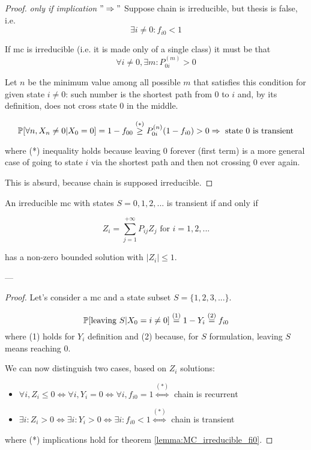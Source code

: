 	\begin{proof} \emph{only if implication} $"\Rightarrow"$
		Suppose chain is irreducible, but thesis is false, i.e.
		$$ \exists i \neq 0 : f_{i0} < 1 $$

		If \gls{mc} is irreducible (i.e. it is made only of a single class) it must be that
		$$ \forall i \neq 0, \exists m : P_{0i}^{(m)} > 0 $$

		Let $n$ be the minimum value among all possible $m$  that satisfies this condition for given state $i \neq 0$: such number is the shortest path from 0 to $i$ and, by its definition, does not cross state 0 in the middle.

		$$ \mathbb{P}[\forall n, X_n \neq 0 | X_0 = 0] = 1 - f_{00} \stackrel{(*)}{\ge} P_{0i}^{(n)} (1 - f_{i0}) > 0 \Rightarrow \text{ state 0 is transient} $$

		where (*) inequality holds because leaving 0 forever (first term) is a more general case of going to state $i$ via the shortest path and then not crossing 0 ever again.

		This is absurd, because chain is supposed irreducible.
	\end{proof}

	\begin{theorem}
		An irreducible \gls{mc} with states $S = 0, 1, 2, ...$ is transient if and only if

		$$ Z_i = \sum_{j=1}^{+\infty} P_{ij} Z_j \text{ for } i = 1, 2, ...$$

		has a non-zero bounded solution with $ |Z_i| \le 1$.
	\end{theorem}
	---
	\begin{proof}
		Let's consider a \gls{mc} and a state subset $S = \{1, 2, 3, ...\}$.

		$$ \mathbb{P}[\text{leaving } S| X_0 = i \neq 0] \stackrel{(1)}{=}
			1 - Y_i \stackrel{(2)}{=} f_{i0} $$
		where (1) holds for $Y_i$ definition and (2) because, for $S$ formulation, leaving $S$ means reaching 0.

		We can now distinguish two cases, based on $Z_i$ solutions:
		\begin{itemize}
			\item $ \forall i, Z_i \le 0 \Leftrightarrow \forall i, Y_i = 0 \Leftrightarrow \forall i, f_{i0} = 1 \stackrel{(*)}{\Leftrightarrow} $ chain is recurrent

			\item $ \exists i: Z_i > 0 \Leftrightarrow \exists i: Y_i > 0 \Leftrightarrow \exists i: f_{i0} < 1 \stackrel{(*)}{\Leftrightarrow} $ chain is transient
		\end{itemize}
		where (*) implications hold for theorem \ref{lemma:MC_irreducible_fi0}.
	\end{proof}

